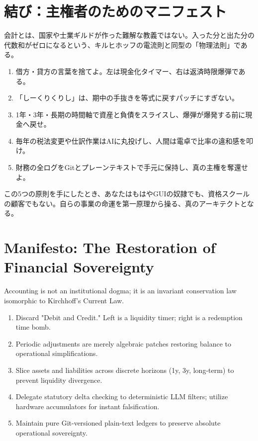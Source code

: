 \ifja
\chapter*{結び：主権者のためのマニフェスト}

会計とは、国家や士業ギルドが作った難解な教義ではない。入った分と出た分の代数和がゼロになるという、キルヒホッフの電流則と同型の「物理法則」である。

\begin{enumerate}
    \item 借方・貸方の言葉を捨てよ。左は現金化タイマー、右は返済時限爆弾である。
    \item 「しーくりくりし」は、期中の手抜きを等式に戻すパッチにすぎない。
    \item 1年・3年・長期の時間軸で資産と負債をスライスし、爆弾が爆発する前に現金へ戻せ。
    \item 毎年の税法変更や仕訳作業はAIに丸投げし、人間は電卓で比率の違和感を叩け。
    \item 財務の全ログをGitとプレーンテキストで手元に保持し、真の主権を奪還せよ。
\end{enumerate}

この5つの原則を手にしたとき、あなたはもはやGUIの奴隷でも、資格スクールの顧客でもない。自らの事業の命運を第一原理から操る、真のアーキテクトとなる。

\else
\chapter*{Manifesto: The Restoration of Financial Sovereignty}

Accounting is not an institutional dogma; it is an invariant conservation law isomorphic to Kirchhoff's Current Law.

\begin{enumerate}
    \item Discard "Debit and Credit." Left is a liquidity timer; right is a redemption time bomb.
    \item Periodic adjustments are merely algebraic patches restoring balance to operational simplifications.
    \item Slice assets and liabilities across discrete horizons (1y, 3y, long-term) to prevent liquidity divergence.
    \item Delegate statutory delta checking to deterministic LLM filters; utilize hardware accumulators for instant falsification.
    \item Maintain pure Git-versioned plain-text ledgers to preserve absolute operational sovereignty.
\end{enumerate}
\fi
